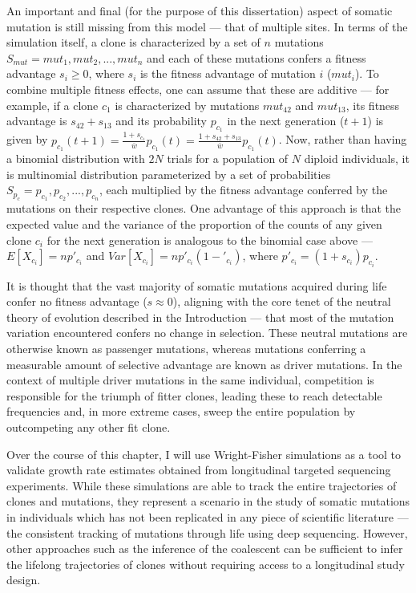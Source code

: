 An important and final (for the purpose of this dissertation) aspect of somatic mutation is still missing from this model --- that of multiple sites. In terms of the simulation itself, a clone is characterized by a set of $n$ mutations $S_{mut} = {mut_1,mut_2,...,mut_n}$ and each of these mutations confers a fitness advantage $s_i \geq 0$, where $s_i$ is the fitness advantage of mutation $i$ ($mut_i$). To combine multiple fitness effects, one can assume that these are additive --- for example, if a clone $c_1$ is characterized by mutations $mut_42$ and $mut_13$, its fitness advantage is $s_42 + s_13$ and its probability $p_{c_1}$ in the next generation ($t+1$) is given by $p_{c_1}(t+1) = \frac{1+s_{c_1}}{\bar{w}}p_{c_1}(t) = \frac{1+s_{42}+s_{13}}{\bar{w}}p_{c_1}(t)$. Now, rather than having a binomial distribution with $2N$ trials for a population of $N$ diploid individuals, it is multinomial distribution parameterized by a set of probabilities $S_{p_c} = {p_{c_1},p_{c_2},...,p_{c_n}}$, each multiplied by the fitness advantage conferred by the mutations on their respective clones. One advantage of this approach is that the expected value and the variance of the proportion of the counts of any given clone $c_i$ for the next generation is analogous to the binomial case above --- $E[X_{c_i}] = np'_{c_i}$ and $Var[X_{c_i}] = np'_{c_i}(1-'_{c_i})$, where $p'_{c_i} = (1+s_{c_i})p_{c_i}$. 

It is thought that the vast majority of somatic mutations acquired during life confer no fitness advantage ($s \approx 0$), aligning with the core tenet of the neutral theory of evolution described in the Introduction --- that most of the mutation variation encountered confers no change in selection. These neutral mutations are otherwise known as passenger mutations, whereas mutations conferring a measurable amount of selective advantage are known as driver mutations. In the context of multiple driver mutations in the same individual, competition is responsible for the triumph of fitter clones, leading these to reach detectable frequencies and, in more extreme cases, sweep the entire population by outcompeting any other fit clone.

Over the course of this chapter, I will use Wright-Fisher simulations as a tool to validate growth rate estimates obtained from longitudinal targeted sequencing experiments. While these simulations are able to track the entire trajectories of clones and mutations, they represent a scenario in the study of somatic mutations in individuals which has not been replicated in any piece of scientific literature --- the consistent tracking of mutations through life using deep sequencing. However, other approaches such as the inference of the coalescent can be sufficient to infer the lifelong trajectories of clones without requiring access to a longitudinal study design.

